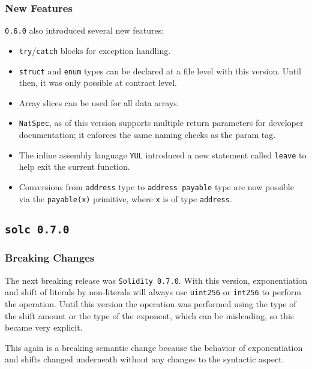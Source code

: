 \subsubsection{New Features}\label{new-features}

\texttt{0.6.0} also introduced several new features:

\begin{itemize}
\tightlist
\item
  \texttt{try}/\texttt{catch} blocks for exception handling.
\item
  \texttt{struct} and \texttt{enum} types can be declared at a file
  level with this version. Until then, it was only possible at contract
  level.
\item
  Array slices can be used for all data arrays.
\item
  \texttt{NatSpec}, as of this version supports multiple return
  parameters for developer documentation; it enforces the same naming
  checks as the param tag.
\item
  The inline assembly language \texttt{YUL} introduced a new statement
  called \texttt{leave} to help exit the current function.
\item
  Conversions from \texttt{address} type to \texttt{address\ payable}
  type are now possible via the \texttt{payable(x)} primitive, where
  \texttt{x} is of type \texttt{address}.
\end{itemize}

\subsection{\texorpdfstring{\texttt{solc\ 0.7.0}}{solc 0.7.0}}\label{solc-0.7.0}

\subsubsection{Breaking Changes}\label{breaking-changes-1}

The next breaking release was \texttt{Solidity\ 0.7.0}. With this
version, exponentiation and shift of literals by non-literals will
always use \texttt{uint256} or \texttt{int256} to perform the operation.
Until this version the operation was performed using the type of the
shift amount or the type of the exponent, which can be misleading, so
this became very explicit.

This again is a breaking semantic change because the behavior of
exponentiation and shifts changed underneath without any changes to the
syntactic aspect.


